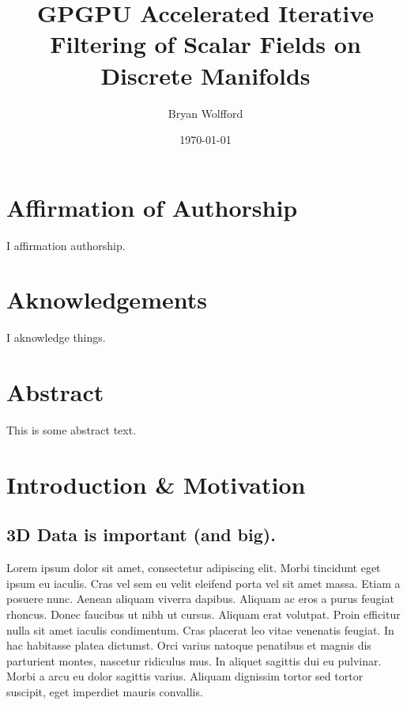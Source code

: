 \documentclass[openany]{book}
\author{Bryan Wolfford}
\title{GPGPU Accelerated Iterative Filtering of Scalar Fields on Discrete Manifolds}
\date{\today} %
\begin{document}
\frontmatter
\maketitle

\chapter{Affirmation of Authorship}
I affirmation authorship.

\chapter{Aknowledgements}
I aknowledge things.

\chapter{Abstract}
This is some abstract text.


\tableofcontents

\listoffigures
\listoftables



\mainmatter
\chapter{Introduction \& Motivation}
\section{3D Data is important (and big).}
Lorem ipsum dolor sit amet, consectetur adipiscing elit. Morbi tincidunt eget 
ipsum eu iaculis. Cras vel sem eu velit eleifend porta vel sit amet massa. Etiam 
a posuere nunc. Aenean aliquam viverra dapibus. Aliquam ac eros a purus feugiat 
rhoncus. Donec faucibus ut nibh ut cursus. Aliquam erat volutpat. Proin efficitur 
nulla sit amet iaculis condimentum. Cras placerat leo vitae venenatis feugiat. In 
hac habitasse platea dictumst. Orci varius natoque penatibus et magnis dis 
parturient montes, nascetur ridiculus mus. In aliquet sagittis dui eu pulvinar. 
Morbi a arcu eu dolor sagittis varius. Aliquam dignissim tortor sed tortor 
suscipit, eget imperdiet mauris convallis.~\cite[p.~00]{SourceNeeded}
\end{document}
